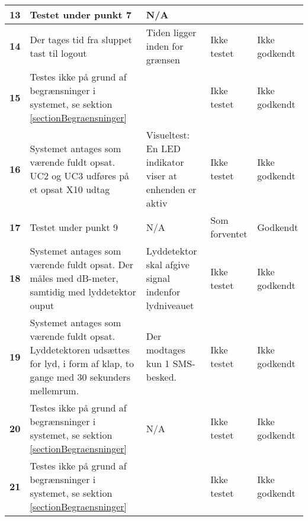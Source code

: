 \begin{center}
\begin{longtable}{|p{}|p{}|p{}|p{}|p{}|}
\textbf{13} &
Testet under punkt 7&
N/A &
 &
 \\\hline

\textbf{14} &
Der tages tid fra sluppet tast til logout&
Tiden ligger inden for grænsen
&Ikke \newline testet
&Ikke \newline godkendt 
 \\\hline

\textbf{15} &
Testes ikke på grund af begrænsninger i systemet, se sektion \ref{sectionBegraensninger}&
&Ikke \newline testet
&Ikke \newline godkendt 
 \\\hline

\textbf{16} &
Systemet antages som værende fuldt opsat.\newline
UC2 og UC3 udføres på et opsat X10 udtag&
Visueltest: En LED indikator viser at enhenden er aktiv
&Ikke \newline testet
&Ikke \newline godkendt 
 \\\hline

\textbf{17} &
Testet under punkt 9&
N/A
&Som \newline forventet
&Godkendt
 \\\hline

\textbf{18} &
Systemet antages som værende fuldt opsat.\newline
Der måles med dB-meter, samtidig med lyddetektor ouput&
Lyddetektor skal afgive signal indenfor lydniveauet
&Ikke \newline testet
&Ikke \newline godkendt 
 \\\hline

\textbf{19} &
Systemet antages som værende fuldt opsat.\newline
Lyddetektoren udsættes for lyd, i form af klap, to gange med 30 sekunders mellemrum.&
Der modtages kun 1 SMS-besked.
&Ikke \newline testet
&Ikke \newline godkendt 
 \\\hline

\textbf{20} &
Testes ikke på grund af begrænsninger i systemet, se sektion \ref{sectionBegraensninger}&
N/A 
&Ikke \newline testet
&Ikke \newline godkendt 
 \\\hline

\textbf{21} &
Testes ikke på grund af begrænsninger i systemet, se sektion \ref{sectionBegraensninger}&
&Ikke \newline testet
&Ikke \newline godkendt 
 \\\hline



	\end{longtable}
	\label{IKFUNK} 
\end{center}